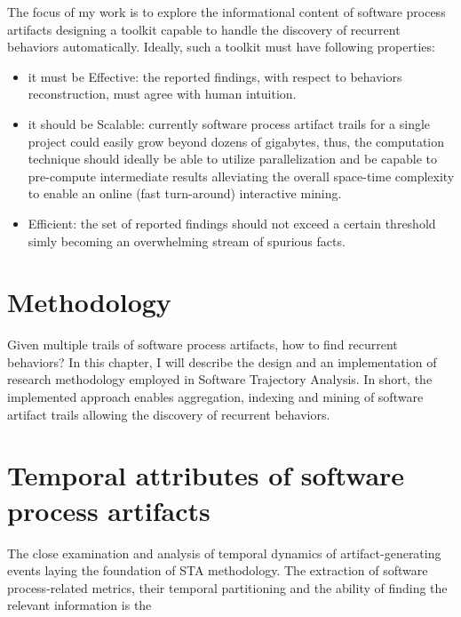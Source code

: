 \documentclass[11pt,oneside]{article}
\numberwithin{equation}{subsection}
\begin{document}
The focus of my work is to explore the informational content of software process artifacts designing 
a toolkit capable to handle the discovery of recurrent behaviors automatically. Ideally, such a toolkit 
must have following properties:
\begin{itemize}
 \item it must be Effective: the reported findings, with respect to behaviors reconstruction, must agree 
 with human intuition.
 \item it should be Scalable: currently software process artifact trails for a single project could easily 
       grow beyond dozens of gigabytes, thus, the computation technique should ideally be able to utilize 
       parallelization and be capable to pre-compute intermediate results alleviating the overall space-time 
       complexity to enable an online (fast turn-around) interactive mining.
 \item Efficient: the set of reported findings should not exceed a certain threshold simly becoming an 
        overwhelming stream of spurious facts.
\end{itemize}


\section{Methodology} \label{JMotif}
Given multiple trails of software process artifacts, how to find recurrent behaviors? In this chapter, 
I will describe the design and an implementation of research methodology employed in Software Trajectory 
Analysis. In short, the implemented approach enables aggregation, indexing and mining of software 
artifact trails allowing the discovery of recurrent behaviors. 

\section{Temporal attributes of software process artifacts}
The close examination and analysis of temporal dynamics of artifact-generating events laying the foundation 
of STA methodology. The extraction of software process-related metrics, their temporal partitioning and the
ability of finding the relevant information is the 





%
%
\end{document}
